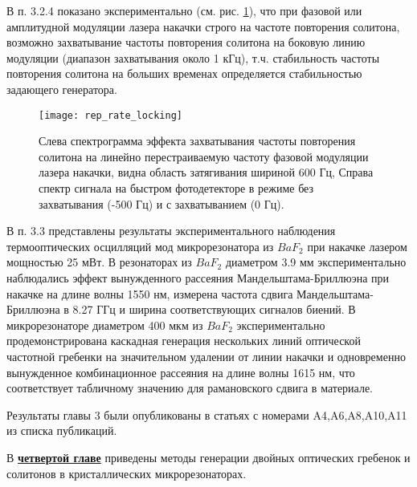 В п. 3.2.4 показано экспериментально (см. рис. \ref{rep_rate_locking}), что при фазовой или амплитудной модуляции лазера накачки строго на частоте повторения солитона, возможно захватывание частоты повторения солитона на боковую линию модуляции (диапазон захватывания около 1 кГц), т.ч. стабильность частоты повторения солитона на больших временах определяется стабильностью задающего генератора.

\begin{figure}[ht]
  \centering
  \texttt{[image: rep\_rate\_locking]}
  \caption{Слева спектрограмма эффекта захватывания частоты повторения солитона на линейно перестраиваемую частоту фазовой модуляции лазера накачки, видна область затягивания шириной 600 Гц, Справа спектр сигнала на быстром фотодетекторе в режиме без захватывания (-500 Гц) и с захватыванием (0 Гц).}
  \label{rep_rate_locking}
\end{figure}

В п. 3.3 представлены результаты экспериментального наблюдения термооптических осцилляций мод микрорезонатора из $BaF_2$ при накачке лазером мощностью 25 мВт. В резонаторах из $BaF_2$ диаметром 3.9 мм экспериментально наблюдались эффект вынужденного рассеяния Мандельштама-Бриллюэна при накачке на длине волны 1550 нм, измерена частота сдвига Мандельштама-Бриллюэна в 8.27 ГГц и ширина соответствующих сигналов биений. В микрорезонаторе диаметром 400 мкм из $BaF_2$ экспериментально продемонстрирована каскадная генерация нескольких линий оптической частотной гребенки на значительном удалении от линии накачки и одновременно вынужденное комбинационное рассеяния на длине волны 1615 нм, что соответствует табличному значению для рамановского сдвига в материале.

Результаты главы 3 были опубликованы в статьях с номерами A4,A6,A8,A10,A11 из списка публикаций.

В \underline{\textbf{четвертой главе}} приведены методы генерации двойных оптических гребенок и солитонов в кристаллических микрорезонаторах.

